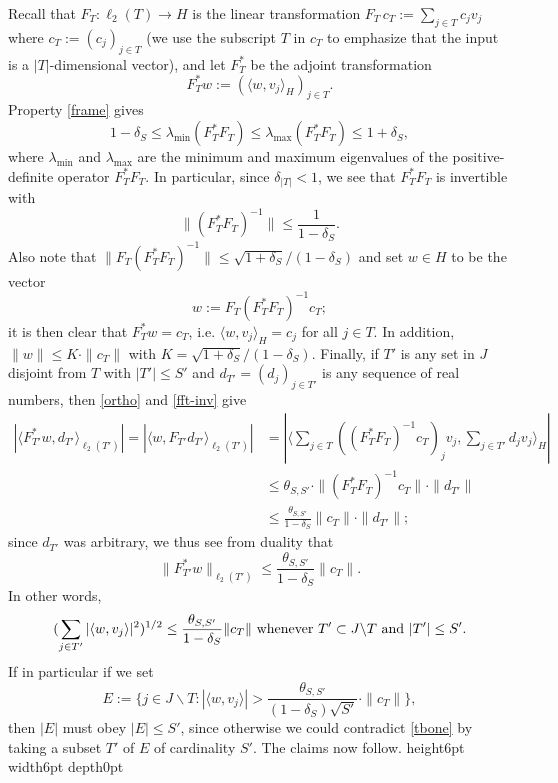\documentclass[11pt]{article}
\newenvironment{proof}{\noindent {\bf Proof} }{\endprf\par}
\def \endprf{\hfill {\vrule height6pt width6pt depth0pt}\medskip}
\newcommand{\<}{\langle}
\renewcommand{\>}{\rangle}
\numberwithin{equation}{section}
\begin{document}
\begin{proof}  Recall that $F_T: \ell_2(T) \to H$ is the linear 
  transformation $F_T \, c_T := \sum_{j \in T} c_j v_j$ where $c_T :=
  (c_j)_{j \in T}$ (we use the subscript $T$ in $c_T$ to emphasize
  that the input is a $|T|$-dimensional vector), and let $F_T^*$ be the
  adjoint transformation
$$
  F_T^* w := (\langle w, v_j \rangle_H)_{j \in T}.
$$
  Property 
  \eqref{frame} gives   
  $$
  1 - \delta_{S} \leq \lambda_{\min}(F_T^* F_T) \leq
  \lambda_{\max}(F_T^* F_T) \leq 1 + \delta_{S},$$
  where
  $\lambda_{\min}$ and $\lambda_{\max}$ are the minimum and maximum
  eigenvalues of the positive-definite operator $F_T^* F_T$.  In
  particular, since $\delta_{|T|} < 1$, we see that $F_T^* F_T$ is
  invertible with
\begin{equation}\label{fft-inv}
 \| (F^*_T F_T)^{-1} \| \leq \frac{1}{1 - \delta_{S}}.
 \end{equation}
 Also note that $\| F_T (F^*_T F_T)^{-1}\| \le \sqrt{1 +
   \delta_S}/(1-\delta_S)$ and set $w \in H$ to be the vector
 $$
 w := F_T (F^*_T F_T)^{-1} c_T;
 $$
 it is then clear that $F^*_T w = c_T$, i.e.  $\langle w, v_j
 \rangle_H = c_j$ for all $j \in T$.  In addition, $\|w\| \le K \cdot
 \|c_T\|$ with $K = \sqrt{1 + \delta_S}/(1-\delta_S)$. 
 Finally, if $T'$ is any set in $J$ disjoint from $T$ with $|T'| \leq
 S'$ and $d_{T'} = (d_j)_{j \in T'}$ is any sequence of real numbers,
 then \eqref{ortho} and \eqref{fft-inv} give
\begin{align*}
  |\langle F^*_{T'} w, d_{T'} \rangle_{\ell_2(T')}| = |\langle w,
  F_{T'} d_{T'} \rangle_{\ell_2(T')}| & = \left|\langle \sum_{j \in T}
    ((F^*_T F_T)^{-1} c_T)_j v_j,
    \sum_{j \in T'} d_j v_j \rangle_H\right| \\
  &\leq \theta_{S,S'} \cdot \| (F^*_T F_T)^{-1} c_T \| \cdot
  \| d_{T'} \| \\
  &\leq \frac{\theta_{S,S'}}{1 - \delta_S} \| c_T \| \cdot \|d_{T'}\|;
\end{align*}
since $d_{T'}$ was arbitrary, we thus see from duality that
$$
\| F^*_{T'} w \|_{\ell_2(T')} \leq \frac{\theta_{S,S'}}{1 -
  \delta_{S}} \| c_T\|.$$
In other words,
\begin{equation}\label{tbone}
 (\sum_{j \in T'} |\langle w, v_j \rangle|^2)^{1/2} \leq
\frac{\theta_{S,S'}}{1 - \delta_{S}} \| c_T \| 
\hbox{ whenever } T' \subset J \backslash T \hbox{ and } |T'| \leq S'.
\end{equation}
If in particular if we set
$$
E := \{ j \in J \backslash T: |\langle w, v_j \rangle| >
\frac{\theta_{S,S'}}{(1 - \delta_{S})\sqrt{S'}} \cdot \|c_T\|\},
$$
then $|E|$ must obey $|E| \leq S'$, since otherwise we could
contradict \eqref{tbone} by taking a subset $T'$ of $E$ of cardinality
$S'$.  The claims now follow.
\end{proof}
\end{document}

